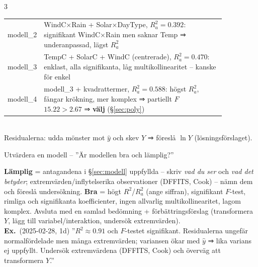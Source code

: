 \documentclass[8pt]{extarticle}
\makeatletter
\newcounter{sect}
\newcommand{\sect}[3][hd]{\par\vspace{1.5pt}\refstepcounter{sect}\noindent
  {\setlength{\fboxsep}{1.8pt}\colorbox{#1}{\parbox{\dimexpr\linewidth-2\fboxsep}{\color{white}\sffamily\bfseries
  \strut\thesect\enspace #2}}}\label{#3}\par\nobreak\vspace{0.8pt}\@afterheading}
\newcommand{\ex}{{\color{ex}\sffamily\bfseries Ex.}\ }
\makeatother
\begin{document}
\begin{multicols*}{3}
{\begin{tabular}{@{}l>{\raggedright\arraybackslash}p{0.86\linewidth}@{}}
modell\_2 & WindC×Rain + Solar×DayType, $R^2_a=0.392$: signifikant WindC×Rain men saknar Temp ⇒ underanpassad, lägst $R^2_a$\\
modell\_3 & TempC + SolarC + WindC (centrerade), $R^2_a=0.470$: enklast, alla signifikanta, låg multikollinearitet – kanske för enkel\\
modell\_4 & modell\_3 + kvadrattermer, $R^2_a=0.588$: högst $R^2_a$, fångar krökning, mer komplex ⇒ partiellt $F$ $15.22>2.67$ ⇒ \textbf{välj} (§\ref{sec:poly})
\end{tabular}}\\[1pt]
Residualerna: udda mönster mot $\hat y$ och skev $Y$ ⇒ föreslå $\ln Y$ (lösningsförslaget).

\sect[cBygg]{Utvärdera en modell – ”Är modellen bra och lämplig?”}{sec:utvardera}
\textbf{Lämplig} = antagandena i §\ref{sec:modell} uppfyllda – skriv \emph{vad du ser} och \emph{vad det betyder}; extremvärden/inflytelserika observationer (DFFITS, Cook) – nämn dem och föreslå undersökning. \textbf{Bra} = högt $R^2$/$R^2_a$ (ange siffran), signifikant $F$-test, rimliga och signifikanta koefficienter, ingen allvarlig multikollinearitet, lagom komplex. Avsluta med en samlad bedömning + förbättringsförslag (transformera $Y$, lägg till variabel/interaktion, undersök extremvärden).\\
\ex (2025-02-28, 1d) ”$R^2\approx0.91$ och $F$-testet signifikant. Residualerna ungefär normalfördelade men många extremvärden; variansen ökar med $\hat y$ ⇒ lika varians ej uppfyllt. Undersök extremvärdena (DFFITS, Cook) och överväg att transformera $Y$.”


\end{multicols*}
\end{document}
